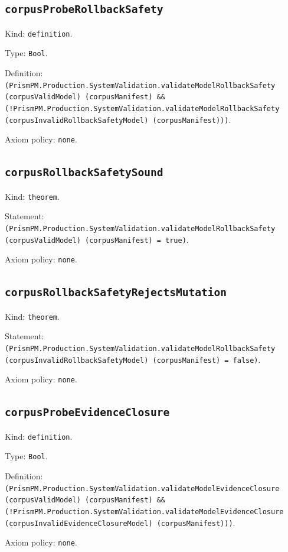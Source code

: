 \documentclass[11pt]{article}
\begin{document}
\subsection*{\texttt{corpusProbeRollbackSafety}}
\noindent Kind: \texttt{definition}.\par
\noindent Type: \texttt{Bool}.\par
\noindent Definition: \texttt{(PrismPM.Production.SystemValidation.validateModelRollbackSafety (corpusValidModel) (corpusManifest) \&\& (!PrismPM.Production.SystemValidation.validateModelRollbackSafety (corpusInvalidRollbackSafetyModel) (corpusManifest)))}.\par
\noindent Axiom policy: \texttt{none}.\par
\subsection*{\texttt{corpusRollbackSafetySound}}
\noindent Kind: \texttt{theorem}.\par
\noindent Statement: \texttt{(PrismPM.Production.SystemValidation.validateModelRollbackSafety (corpusValidModel) (corpusManifest) = true)}.\par
\noindent Axiom policy: \texttt{none}.\par
\subsection*{\texttt{corpusRollbackSafetyRejectsMutation}}
\noindent Kind: \texttt{theorem}.\par
\noindent Statement: \texttt{(PrismPM.Production.SystemValidation.validateModelRollbackSafety (corpusInvalidRollbackSafetyModel) (corpusManifest) = false)}.\par
\noindent Axiom policy: \texttt{none}.\par
\subsection*{\texttt{corpusProbeEvidenceClosure}}
\noindent Kind: \texttt{definition}.\par
\noindent Type: \texttt{Bool}.\par
\noindent Definition: \texttt{(PrismPM.Production.SystemValidation.validateModelEvidenceClosure (corpusValidModel) (corpusManifest) \&\& (!PrismPM.Production.SystemValidation.validateModelEvidenceClosure (corpusInvalidEvidenceClosureModel) (corpusManifest)))}.\par
\noindent Axiom policy: \texttt{none}.\par
\end{document}
